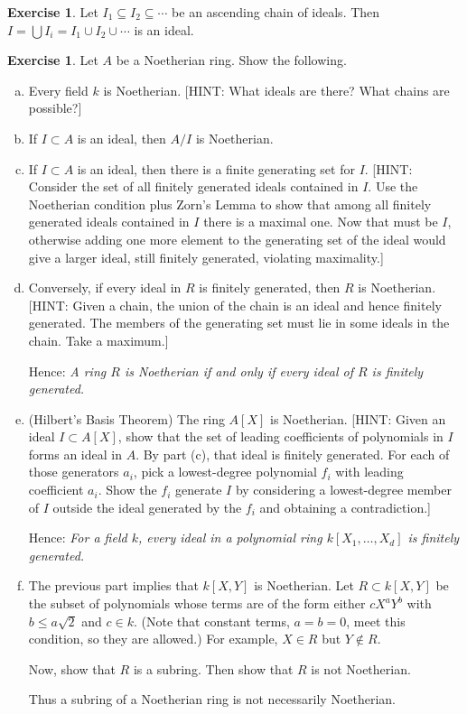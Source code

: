 \documentclass{amsart}
\theoremstyle{plain}
\theoremstyle{definition}
\newtheorem{exercise}[theorem]{Exercise}
\theoremstyle{definition}
\begin{document}
\begin{exercise}
Let $I_1 \subseteq I_2 \subseteq \cdots$ be an ascending chain of ideals.
Then $I = \bigcup I_i = I_1 \cup I_2 \cup \cdots$ is an ideal.
\end{exercise}


\begin{exercise}
Let $A$ be a Noetherian ring. Show the following.
\begin{enumerate}[a.]
\item Every field $k$ is Noetherian. [HINT: What ideals are there? What chains are possible?]
\item If $I \subset A$ is an ideal, then $A/I$ is Noetherian.
\item If $I \subset A$ is an ideal, then there is a finite generating set for $I$.
[HINT: Consider the set of all finitely generated ideals contained in $I$.
Use the Noetherian condition plus Zorn's Lemma to show that among all finitely
generated ideals contained in $I$ there is a maximal one.
Now that must be $I$, otherwise adding one more element to the generating set of the ideal
would give a larger ideal, still finitely generated, violating maximality.]
\item Conversely, if every ideal in $R$ is finitely generated, then $R$ is Noetherian.
[HINT: Given a chain, the union of the chain is an ideal and hence finitely generated.
The members of the generating set must lie in some ideals in the chain. Take a maximum.]

Hence: \textit{A ring $R$ is Noetherian if and only if every ideal of $R$
is finitely generated.}
\item (Hilbert's Basis Theorem) The ring $A[X]$ is Noetherian.
[HINT: Given an ideal $I \subset A[X]$, show that the set of leading coefficients of polynomials in $I$
forms an ideal in $A$. By part (c), that ideal is finitely generated.
For each of those generators $a_i$, pick a lowest-degree polynomial $f_i$ with leading coefficient $a_i$.
Show the $f_i$ generate $I$ by considering a lowest-degree member of $I$
outside the ideal generated by the $f_i$ and obtaining a contradiction.]

Hence: \textit{For a field $k$, every ideal in a polynomial ring $k[X_1,\dots,X_d]$ is finitely generated.}
\item The previous part implies that $k[X,Y]$ is Noetherian.
Let $R \subset k[X,Y]$ be the subset of polynomials whose terms are of the form
either $c X^a Y^b$ with $b \leq a \sqrt{2}$ and $c \in k$.
(Note that constant terms, $a=b=0$, meet this condition, so they are allowed.)
For example, $X \in R$ but $Y \notin R$.

Now, show that $R$ is a subring. Then show that $R$ is not Noetherian.


Thus a subring of a Noetherian ring is not necessarily Noetherian.
\end{enumerate}
\end{exercise}
\end{document}

